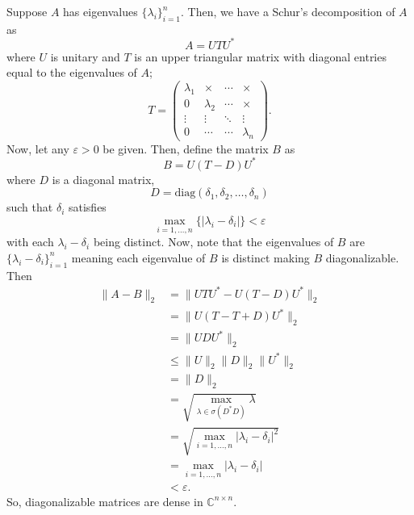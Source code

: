 \documentclass[a4paper,12pt]{article}
\newcommand{\comps}{\mathbb{C}}
\newcommand{\abs}[1]{\left| #1 \right|}
\newcommand{\diag}{\mathrm{diag}}
\newcommand{\norm}[1]{\lVert #1 \rVert}
\newcommand{\pmat}[1]{\begin{pmatrix} #1 \end{pmatrix}}
\begin{document}
\begin{enumerate}[label = (\arabic*)]
 	Suppose $ A $ has eigenvalues $ \{ \lambda_i \}_{i = 1}^n $. Then, we have a Schur's decomposition of $ A $ as 
 	\[
 		A = U T U^*
 	\]
 	where $ U $ is unitary and $ T $ is an upper triangular matrix with diagonal entries equal to the eigenvalues of $ A $;
 	\[
 	T = 
 	\pmat{
 		\lambda_1 & \times & \cdots & \times \\
 		0 & \lambda_2 & \cdots & \times \\
 		\vdots & \vdots & \ddots & \vdots \\
 		0 & \cdots & \cdots & \lambda_n}.
 	\]
 	Now, let any $ \varepsilon > 0 $ be given. Then, define the matrix $ B $ as
 	\[
 		B = U (T - D) U^*
 	\]
 	where $ D $ is a diagonal matrix, 
 	\[
 		D = \diag(\delta_1, \delta_2, \ldots, \delta_n)
 	\]
 	such that $ \delta_i $ satisfies
 	\[
 		\max_{i = 1, \ldots, n} \{\abs{\lambda_i - \delta_i}\} < \varepsilon
 	\]
 	with each $ \lambda_i - \delta_i $ being distinct.
 	Now, note that the eigenvalues of $ B $ are $ \{\lambda_i - \delta_i\}_{i = 1}^n $ meaning each eigenvalue of $ B $ is distinct making $ B $ diagonalizable. Then
 	\begin{align*}
 		\norm{A - B}_2 &= \norm{U T U^* - U (T - D) U^*}_2 \\
 		&= \norm{U (T - T + D) U^*}_2 \\
 		&= \norm{U D U^*}_2 \\
 		&\leq \norm{U}_2 \norm{D}_2 \norm{U^*}_2 \\
 		&= \norm{D}_2 \\ 
 		&= \sqrt{\max_{\lambda \in \sigma(D^* D)} \lambda} \\
 		&= \sqrt{\max_{i = 1, \ldots, n} \abs{\lambda_i - \delta_i}^2} \\
 		&= \max_{i = 1, \ldots, n} \abs{\lambda_i - \delta_i}\\
 		&< \varepsilon.
  	\end{align*}
  	So, diagonalizable matrices are dense in $ \comps^{n \times n}$.
\end{enumerate}
\end{document}
